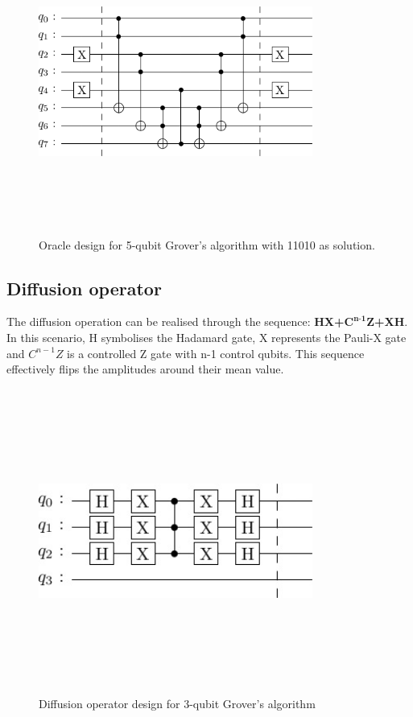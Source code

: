 \documentclass[conference]{IEEEtran}
\begin{document}
\begin{figure}[htbp]
	\centerline{\includegraphics[width=9cm,height=10cm,keepaspectratio]{5-qubit-11010.png}}
	\caption{Oracle design for 5-qubit Grover's algorithm with 11010 as solution.}
	\label{fig:5-qubit}
\end{figure}

\subsection{Diffusion operator}
The diffusion operation can be realised through the sequence: \textbf{HX+$\textbf{C}^{\textbf{n-1}}\textbf{Z}$+XH}. In this scenario, H symbolises
the Hadamard gate, X represents the Pauli-X gate and $C^{n-1}Z$ is a controlled Z gate with n-1 control qubits. This sequence effectively flips the amplitudes around their
mean value.

\begin{figure}[htbp]
	\centerline{\includegraphics[width=9cm,height=10cm,keepaspectratio]{3-qubit-diff.png}}
	\caption{Diffusion operator design for 3-qubit Grover’s algorithm}
	\label{3diff}
\end{figure}
\end{document}

